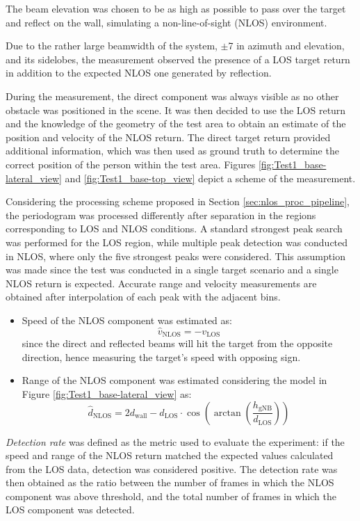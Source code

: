 The beam elevation was chosen to be as high as possible to pass over the target and reflect on the wall, simulating a non-line-of-sight (NLOS) environment.

Due to the rather large beamwidth of the system, $\pm$7\textdegree\hspace{1pt} in azimuth and elevation, and its sidelobes, the measurement observed the presence of a LOS target return in addition to the expected NLOS one generated by reflection.

During the measurement, the direct component was always visible as no other obstacle was positioned in the scene. It was then decided to use the LOS return and the knowledge of the geometry of the test area to obtain an estimate of the position and velocity of the NLOS return. 
The direct target return provided additional information, which was then used as ground truth to determine the correct position of the person within the test area.
Figures \ref{fig:Test1_base-lateral_view} and \ref{fig:Test1_base-top_view} depict a scheme of the measurement.

Considering the processing scheme proposed in Section \ref{sec:nlos_proc_pipeline}, the periodogram was processed differently after separation in the regions corresponding to LOS and NLOS conditions.
A standard strongest peak search was performed for the LOS region, while multiple peak detection was conducted in NLOS, where only the five strongest peaks were considered. This assumption was made since the test was conducted in a single target scenario and a single NLOS return is expected.
Accurate range and velocity measurements are obtained after interpolation of each peak with the adjacent bins.

\begin{itemize}
	\item Speed of the NLOS component was estimated as:
	$$ \hat{v}_{\text{NLOS}} = -v_{\text{LOS}}$$
	since the direct and reflected beams will hit the target from the opposite direction, hence measuring the target's speed with opposing sign.
	\item Range of the NLOS component was estimated considering the model in Figure \ref{fig:Test1_base-lateral_view} as:
	$$ \hat{d}_{\text{NLOS}} = 2 d_{\text{wall}} - d_{\text{LOS}}\cdot \cos{(\arctan{\left(\frac{h_{\text{gNB}}}{d_{\text{LOS}}}\right)})}$$
\end{itemize}


\textit{Detection rate} was defined as the metric used to evaluate the experiment: if the speed and range of the NLOS return matched the expected values calculated from the LOS data, detection was considered positive.
The detection rate was then obtained as the ratio between the number of frames in which the NLOS component was above threshold, and the total number of frames in which the LOS component was detected.


